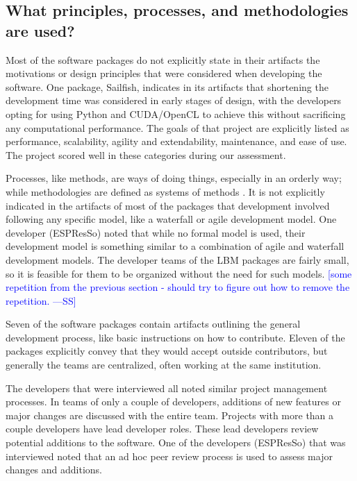 \documentclass[final, 3p, times, authoryear]{elsarticle}
\newcommand{\authornote}[3]{\textcolor{#1}{[#3 ---#2]}}
\newcommand{\authornote}[3]{}
\newcommand{\wss}[1]{\authornote{blue}{SS}{#1}} %
\begin{document}
\subsection{What principles, processes, and methodologies are used?}
\label{prinprocmeth}

Most of the software packages do not explicitly state in their artifacts the
motivations or design principles that were considered when developing the
software. One package, Sailfish, indicates in its artifacts that shortening the
development time was considered in early stages of design, with the developers
opting for using Python and CUDA/OpenCL to achieve this without sacrificing any
computational performance. The goals of that project are explicitly listed as
performance, scalability, agility and extendability, maintenance, and ease of
use. The project scored well in these categories during our assessment.

Processes, like methods, are ways of doing things, especially in an orderly way;
while methodologies are defined as systems of methods
\citep{ghezzi1991fundamentals}. It is not explicitly indicated in the artifacts
of most of the packages that development involved following any specific model,
like a waterfall or agile development model. One developer (ESPResSo) noted that
while no formal model is used, their development model is something similar to a
combination of agile and waterfall development models. The developer teams of
the LBM packages are fairly small, so it is feasible for them to be organized
without the need for such models.  \wss{some repetition from the previous
section - should try to figure out how to remove the repetition.}

Seven of the software packages contain artifacts outlining the general
development process, like basic instructions on how to contribute. Eleven of the
packages explicitly convey that they would accept outside contributors, but
generally the teams are centralized, often working at the same institution. 

The developers that were interviewed all noted similar project management
processes. In teams of only a couple of developers, additions of new features or
major changes are discussed with the entire team. Projects with more than a
couple developers have lead developer roles. These lead developers review
potential additions to the software. One of the developers (ESPResSo) that was
interviewed noted that an ad hoc peer review process is used to assess major
changes and additions.
\end{document}

